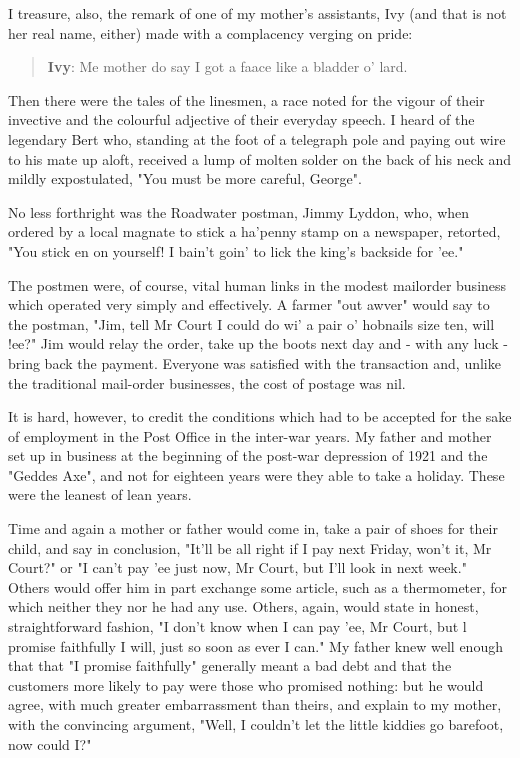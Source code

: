 I treasure, also, the remark of one of my mother's assistants, Ivy (and that is not her real name, either) made with a complacency verging on pride:

\begin{quotation}
\textbf{Ivy}: Me mother do say I got a faace like a bladder o' lard.
\end{quotation}

Then there were the tales of the linesmen, a race noted for the vigour of their invective and the colourful adjective of their everyday speech. I heard of the legendary Bert who, standing at the foot of a telegraph pole and paying out wire to his mate up aloft, received a lump of molten solder on the back of his neck and mildly expostulated, "You must be more careful, George".

No less forthright was the Roadwater postman, Jimmy Lyddon, who, when ordered by a local magnate to stick a ha'penny stamp on a newspaper, retorted, "You stick en on yourself! I bain't goin' to lick the king’s backside for 'ee."

The postmen were, of course, vital human links in the modest mailorder business which operated very simply and effectively. A farmer "out awver" would say to the postman, "Jim, tell Mr Court I could do wi' a pair o' hobnails size ten, will !ee?" Jim would relay the order, take up the boots next day and - with any luck - bring back the payment. Everyone was satisfied with the transaction and, unlike the traditional mail-order businesses, the cost of postage was nil.

It is hard, however, to credit the conditions which had to be accepted for the sake of employment in the Post Office in the inter-war years. My father and mother set up in business at the beginning of the post-war depression of 1921 and the "Geddes Axe", and not for eighteen years were they able to take a holiday. These were the leanest of lean years.

Time and again a mother or father would come in, take a pair of shoes for their child, and say in conclusion, "It'll be all right if I pay next Friday, won't it, Mr Court?" or "I can't pay 'ee just now, Mr Court, but I'll look in next week." Others would offer him in part exchange some article, such as a thermometer, for which neither they nor he had any use. Others, again, would state in honest, straightforward fashion, "I don't know when I can pay 'ee, Mr Court, but l promise faithfully I will, just so soon as ever I can." My father knew well enough that that "I promise faithfully" generally meant a bad debt and that the customers more likely to pay were those who promised nothing: but he would agree, with much greater embarrassment than theirs, and explain to my mother, with the convincing argument, "Well, I couldn't let the little kiddies go barefoot, now could I?"

